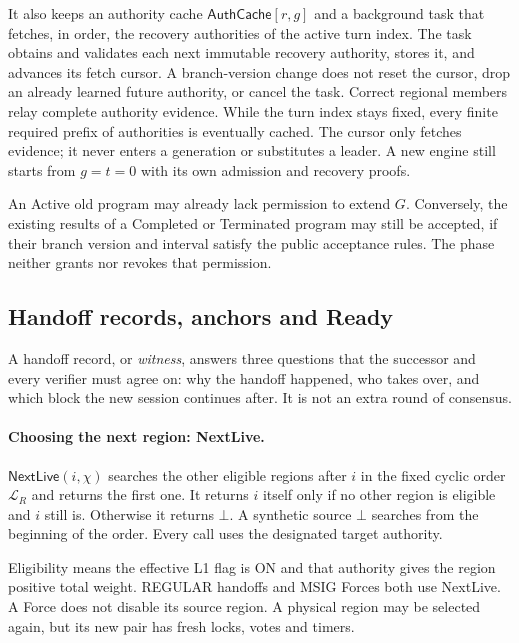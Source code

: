 \documentclass[11pt,a4paper]{article}
\newcommand{\tagg}[1]{\ensuremath{\mathsf{#1}}}
\newcommand{\defterm}[1]{\textcolor{rrBlue}{\textit{#1}}}
\begin{document}
It also keeps an authority cache $\tagg{AuthCache}[r,g]$ and a background
task that fetches, in order, the recovery authorities of the active
turn index. The task obtains and validates each next immutable recovery
authority, stores it, and advances its fetch cursor. A branch-version
change does not reset the cursor, drop an already learned future
authority, or cancel the task. Correct regional members relay complete
authority evidence. While the turn index stays fixed, every finite
required prefix of authorities is eventually cached. The cursor only
fetches evidence; it never enters a generation or substitutes a leader.
A new engine still starts from $g=t=0$ with its own admission and
recovery proofs.

An Active old program may already lack permission to extend $G$.
Conversely, the existing results of a Completed or Terminated program may
still be accepted, if their branch version and interval satisfy the
public acceptance rules. The phase neither grants nor revokes that
permission.

\subsection{Handoff records, anchors and Ready}
\label{sec:witness}
A handoff record, or \defterm{witness}, answers three questions that the
successor and every verifier must agree on: why the handoff happened,
who takes over, and which block the new session continues after. It is
not an extra round of consensus.

\paragraph{Choosing the next region: NextLive.}
$\tagg{NextLive}(i,\chi)$ searches the other eligible regions after $i$
in the fixed cyclic order $\mathcal L_R$ and returns the first one. It
returns $i$ itself only if no other region is eligible and $i$ still is.
Otherwise it returns $\bot$. A synthetic source $\bot$ searches from the
beginning of the order. Every call uses the designated target authority.

Eligibility means the effective L1 flag is ON and that authority gives
the region positive total weight. REGULAR handoffs and MSIG Forces both
use NextLive. A Force does not disable its source region. A physical
region may be selected again, but its new pair has fresh locks, votes and
timers.
\end{document}
